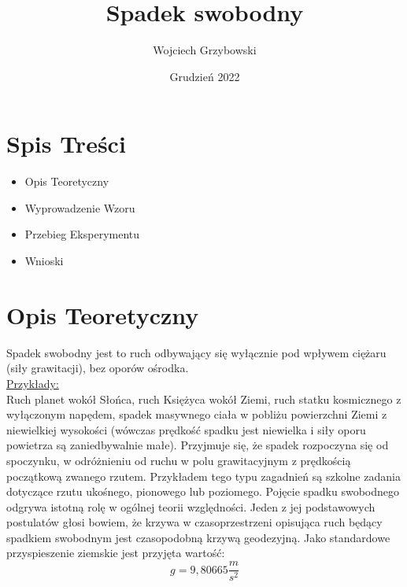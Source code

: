 \documentclass[11.5pt, arev]{article}
\title{Spadek swobodny}
\author{Wojciech Grzybowski}
\date{Grudzień 2022}
\begin{document}

\maketitle

\section{Spis Treści}
\vspace{5mm}
\begin{itemize}

\item Opis Teoretyczny
\item Wyprowadzenie Wzoru
\item Przebieg Eksperymentu
\item Wnioski

\end{itemize}
\section{Opis Teoretyczny}
\vspace{4mm}

Spadek swobodny jest to ruch odbywający się wyłącznie pod wpływem ciężaru
(siły grawitacji), bez oporów ośrodka.
\\\underline{Przykłady:}\\
Ruch planet wokół Słońca, ruch Księżyca wokół Ziemi, ruch statku kosmicznego 
z wyłączonym napędem, spadek masywnego ciała w pobliżu powierzchni Ziemi 
z niewielkiej wysokości 
(wówczas prędkość spadku jest niewielka i siły oporu powietrza są zaniedbywalnie małe).
Przyjmuje się, że spadek rozpoczyna się od spoczynku, w odróżnieniu od ruchu 
w polu grawitacyjnym z prędkością początkową zwanego rzutem. 
Przykładem tego typu zagadnień są szkolne zadania dotyczące rzutu ukośnego, pionowego 
lub poziomego. Pojęcie spadku swobodnego odgrywa istotną rolę w ogólnej 
teorii względności. Jeden z jej podstawowych postulatów głosi bowiem,
że krzywa w czasoprzestrzeni opisująca ruch będący spadkiem swobodnym 
jest czasopodobną krzywą geodezyjną. Jako standardowe przyspieszenie ziemskie jest przyjęta wartość: \begin{equation}
    g = 9,80665 \frac{m}{s^2} \nonumber
\end{equation} 
\end{document}
